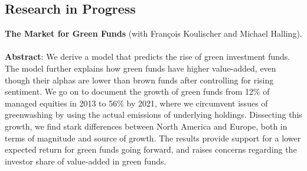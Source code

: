 \documentclass[11pt]{res} %
\newcommand{\fullhrulefill}{%
  \vspace{-1ex}%
  \hspace*{-\sectionwidth}\hrulefill%
  }
\begin{document}
\begin{resume}
\begin{etaremune}
\section{Research in Progress} 
\vspace{1ex}
\fullline
\vspace{1ex}




\item {\bf The Market for Green Funds} (with François Koulischer and Michael Halling).\\
\\[-0.9em]
\textbf{Abstract}: 
We derive a model that predicts the rise of green investment funds. The model further explains how green funds have higher value-added, even though their alphas are lower than brown funds after controlling for rising sentiment. We go on to document the growth of green funds from 12\% of managed equities in 2013 to 56\% by 2021, where we circumvent issues of greenwashing by using the actual emissions of underlying holdings. Dissecting this growth, we find stark differences between North America and Europe, both in terms of magnitude and source of growth. The results provide support for a lower expected return for green funds going forward, and raises concerns regarding the investor share of value-added in green funds.


\iffalse
\item \textbf{Commodity options and expected returns and real variables}\\

\item \textbf{Regulatory Uncertainty and Capital Buffers} (with Jens Dick-Nielsen)\\
Financial regulation has since the crises been uncertain, leading to significant changes for financial agents. Using a simple model, we show how uncertainty about future regulation might affect current behaviour.
\fi


\end{etaremune}


\vspace{0.2in} %



\end{resume}
\end{document}
